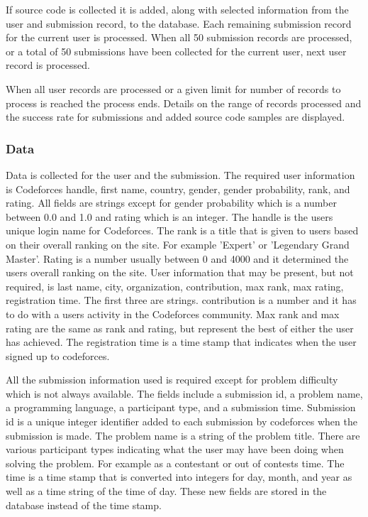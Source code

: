 \documentclass{article}
\begin{document}
If source code is collected it is added, along with selected information from the user and submission record, to the database. Each remaining submission record for the current user is processed. When all 50 submission records are processed, or a total of 50 submissions have been collected for the current user, next user record is processed.

When all user records are processed or a given limit for number of records to process is reached the process ends. Details on the range of records processed and the success rate for submissions and added source code samples are displayed.

\subsubsection*{Data}
Data is collected for the user and the submission. The required user information is Codeforces handle, first name, country, gender, gender probability, rank, and rating. All fields are strings except for gender probability which is a number between 0.0 and 1.0 and rating which is an integer. The handle is the users unique login name for Codeforces. The rank is a title that is given to users based on their overall ranking on the site. For example 'Expert' or 'Legendary Grand Master'. Rating is a number usually between 0 and 4000 and it determined the users overall ranking on the site. User information that may be present, but not required, is last name, city, organization, contribution, max rank, max rating, registration time. The first three are strings. contribution is a number and it has to do with a users activity in the Codeforces community. Max rank and max rating are the same as rank and rating, but represent the best of either the user has achieved. The registration time is a time stamp that indicates when the user signed up to codeforces.

All the submission information used is required except for problem difficulty which is not always available. The fields include a submission id, a problem name, a programming language, a participant type, and a submission time. Submission id is a unique integer identifier added to each submission by codeforces when the submission is made. The problem name is a string of the problem title. There are various participant types indicating what the user may have been doing when solving the problem. For example as a contestant or out of contests time. The time is a time stamp that is converted into integers for day, month, and year as well as a time string of the time of day. These new fields are stored in the database instead of the time stamp.
\end{document}
